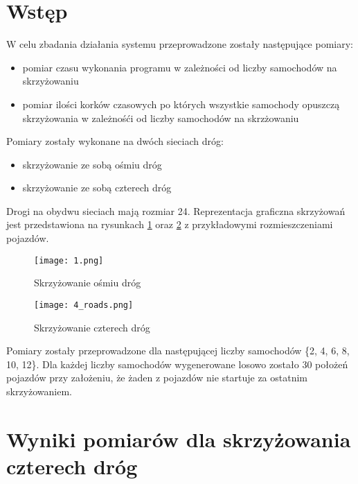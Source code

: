  \label{chap:outcomes}

\section{Wstęp}

W celu zbadania działania systemu przeprowadzone zostały następujące pomiary:

\begin{itemize}
\item pomiar czasu wykonania programu w zależności od liczby samochodów na skrzyżowaniu 
\item pomiar ilości korków czasowych po których wszystkie samochody opuszczą skrzyżowania w zależnośći od liczby samochodów na skrzżowaniu
\end{itemize}

Pomiary zostały wykonane na dwóch sieciach dróg:
\begin{itemize}
\item skrzyżowanie ze sobą ośmiu dróg
\item skrzyżowanie ze sobą czterech dróg
\end{itemize}

Drogi na obydwu sieciach mają rozmiar 24.
\newline
\newline
Reprezentacja graficzna skrzyżowań jest przedstawiona na rysunkach \ref{eight-roads-crossroads} oraz \ref{four-roads-crossroads} z przykładowymi rozmieszczeniami pojazdów.
\begin{figure}
    \texttt{[image: 1.png]}
  \caption{Skrzyżowanie ośmiu dróg}
  \label{eight-roads-crossroads}
\end{figure}
\begin{figure}
    \texttt{[image: 4\_roads.png]}
  \caption{Skrzyżowanie czterech dróg}
  \label{four-roads-crossroads}
\end{figure}

Pomiary zostały przeprowadzone dla następującej liczby samochodów \{2, 4, 6, 8, 10, 12\}.
\newline
\newline
Dla każdej liczby samochodów wygenerowane losowo zostało 30 położeń pojazdów przy założeniu, że żaden z pojazdów nie startuje za ostatnim skrzyżowaniem.

\section{Wyniki pomiarów dla skrzyżowania czterech dróg}

